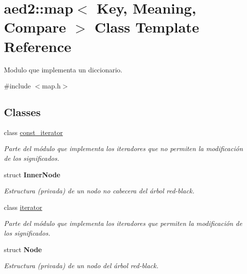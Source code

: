 \hypertarget{classaed2_1_1map}{\section{aed2\-:\-:map$<$ \-Key, \-Meaning, \-Compare $>$ \-Class \-Template \-Reference}
\label{classaed2_1_1map}
}


\-Modulo que implementa un diccionario.  




{\ttfamily \#include $<$map.\-h$>$}

\subsection*{\-Classes}
\begin{DoxyCompactItemize}
\item 
class \hyperlink{classaed2_1_1map_1_1const__iterator}{const\-\_\-iterator}
\begin{DoxyCompactList}\small\item\em \-Parte del módulo que implementa los iteradores que no permiten la modificación de los significados. \end{DoxyCompactList}\item 
struct {\bfseries \-Inner\-Node}
\begin{DoxyCompactList}\small\item\em \-Estructura (privada) de un nodo no cabecera del árbol red-\/black. \end{DoxyCompactList}\item 
class \hyperlink{classaed2_1_1map_1_1iterator}{iterator}
\begin{DoxyCompactList}\small\item\em \-Parte del módulo que implementa los iteradores que permiten la modificación de los significados. \end{DoxyCompactList}\item 
struct {\bfseries \-Node}
\begin{DoxyCompactList}\small\item\em \-Estructura (privada) de un nodo del árbol red-\/black. \end{DoxyCompactList}\end{DoxyCompactItemize}
